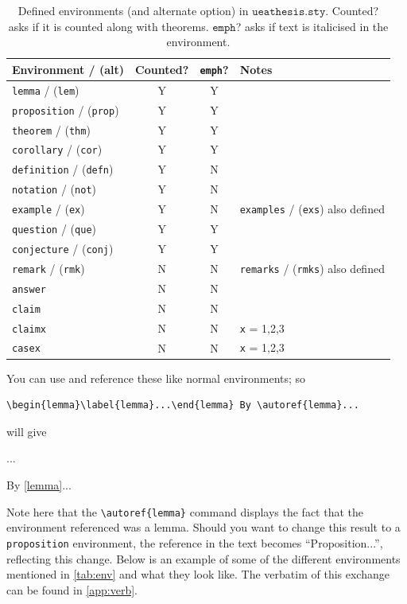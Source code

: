 \begin{table}[ht]
\renewcommand{\arraystretch}{1.5}
\centering
\begin{tabular}{lccl}
Environment / (alt) & Counted? & \verb|emph|? & Notes\\ \hline
\verb|lemma| / (\verb|lem|) & Y & Y & \\
\verb|proposition| / (\verb|prop|) & Y & Y & \\
\verb|theorem| / (\verb|thm|) & Y & Y & \\
\verb|corollary| / (\verb|cor|)  & Y & Y & \\
\verb|definition| / (\verb|defn|) & Y & N & \\
\verb|notation| / (\verb|not|) & Y & N & \\
\verb|example| / (\verb|ex|) & Y & N & \verb|examples| / (\verb|exs|) also defined\\
\verb|question| / (\verb|que|) & Y & Y & \\
\verb|conjecture| / (\verb|conj|) & Y & Y & \\
\verb|remark| / (\verb|rmk|) & N & N & \verb|remarks| / (\verb|rmks|) also defined\\
\verb|answer| & N & N & \\
\verb|claim| & N & N & \\
\verb|claimx| & N & N & \verb|x| = 1,2,3 \\
\verb|casex| & N & N & \verb|x| = 1,2,3 \\
\end{tabular}
\caption[Defined environments (and alternate option) in $\texttt{ueathesis.sty}$]{Defined environments (and alternate option) in $\texttt{ueathesis.sty}$. Counted? asks if it is counted along with theorems. $\texttt{emph}$? asks if text is italicised in the environment.}\label{tab:env}
\end{table}

You can use and reference these like normal environments; so \begin{verbatim}\begin{lemma}\label{lemma}...\end{lemma} By \autoref{lemma}...
\end{verbatim} will give \begin{lemma}\label{lemma} ... \end{lemma} By \autoref{lemma}...

Note here that the \verb|\autoref{lemma}| command displays the fact that the environment referenced was a lemma. Should you want to change this result to a \verb|proposition| environment, the reference in the text becomes ``Proposition...'', reflecting this change. Below is an example of some of the different environments mentioned in \autoref{tab:env} and what they look like. The verbatim of this exchange can be found in \autoref{app:verb}.

